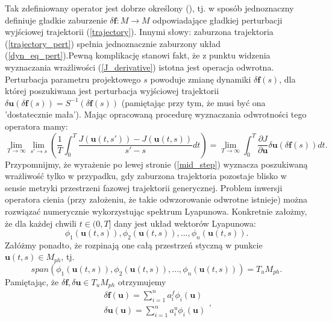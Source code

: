 \documentclass[12pt]{article}
\begin{document}
Tak zdefiniowany operator jest dobrze określony (\cite{Qiqi1}), tj. w sposób jednoznaczny definiuje gładkie zaburzenie $ \delta \textbf{f}: M \rightarrow M $ odpowiadające gładkiej perturbacji wyjściowej trajektorii (\ref{trajectory}). Innymi słowy: zaburzona trajektoria (\ref{trajectory_pert}) spełnia jednoznacznie zaburzony układ (\ref{dyn_eq_pert}).Pewną komplikację stanowi fakt, że z punktu widzenia wyznaczania wrażliwości (\ref{J_derivative}) istotna jest operacja odwrotna. Perturbacja parametru projektowego $ s $ powoduje zmianę dynamiki $ \delta\textbf{f}(s) $, dla której poszukiwana jest perturbacja wyjściowej trajektorii $ \delta \textbf{u}(\delta \textbf{f}(s))  = S^{-1}(\delta \textbf{f}(s))$ (pamiętając przy tym, że musi być ona 'dostatecznie mała'). Mając opracowaną procedurę wyznaczania odwrotności tego operatora mamy:
\begin{equation}
\lim\limits_{T\to\infty}\lim\limits_{s'\to s}(\frac{1}{T}\int_{0}^{T}\frac{J(\textbf{u}(t,s'))-J(\textbf{u}(t,s))}{s'-s}dt) = \lim\limits_{T\to\infty} \int_{0}^{T} {\frac{\partial{J}}{\partial{\textbf{u}}}\delta \textbf{u}(\delta \textbf{f}(s))}dt.
\label{mid_step}	
\end{equation}
Przypomnijmy, że wyrażenie po lewej stronie (\ref{mid_step}) wyznacza poszukiwaną wrażliwość tylko w przypadku, gdy zaburzona trajektoria pozostaje blisko w sensie metryki przestrzeni fazowej trajektorii generycznej. \newline
Problem inwersji operatora cienia (przy założeniu, że takie odwzorowanie odwrotne istnieje) można rozwiązać numerycznie wykorzystując spektrum Lyapunowa. Konkretnie założmy, że dla każdej chwili $ t \in (0,T] $ dany jest układ wektorów Lyapunowa: 
\begin{equation}
\phi_{1}(\textbf{u}(t,s)), \phi_{2}(\textbf{u}(t,s)), ... , \phi_{n}(\textbf{u}(t,s)).
\label{lyapunov_vectors}
\end{equation}
Załóżmy ponadto, że rozpinają one całą przestrzeń styczną w punkcie $ \textbf{u}(t,s) \in M_{ph} $, tj.
\begin{equation}
span(\phi_{1}(\textbf{u}(t,s)), \phi_{2}(\textbf{u}(t,s)), ... , \phi_{n}(\textbf{u}(t,s))) = T_{u}M_{ph}.
\label{lyapunov_vectors_span}
\end{equation}
Pamiętając, że $ \delta \textbf{f}, \delta \textbf{u} \in T_{u}M_{ph} $ otrzymujemy
\begin{equation}
\begin{array}{rcl} 
\delta \textbf{f}(\textbf{u}) = \sum_{i=1}^{n}a^{f}_{i}\phi_{i}(\textbf{u}) \\
\delta \textbf{u}(\textbf{u}) = \sum_{i=1}^{n}a^{u}_{i}\phi_{i}(\textbf{u})
\end{array},
\end{equation}
\end{document}
